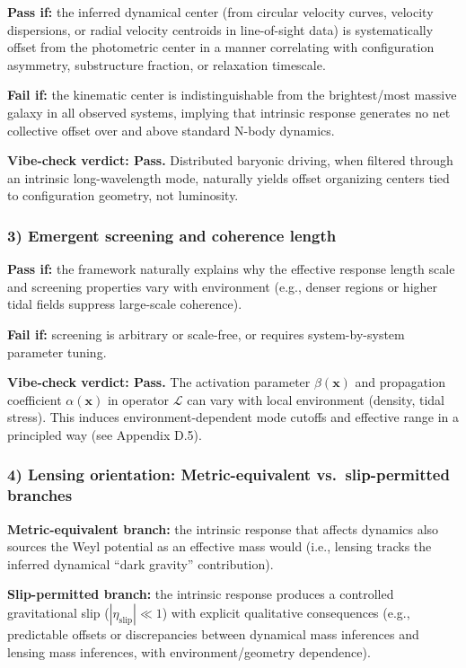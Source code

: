 \textbf{Pass if:} the inferred dynamical center (from circular velocity curves, velocity 
dispersions, or radial velocity centroids in line-of-sight data) is systematically offset 
from the photometric center in a manner correlating with configuration asymmetry, 
substructure fraction, or relaxation timescale.

\textbf{Fail if:} the kinematic center is indistinguishable from the brightest/most massive 
galaxy in all observed systems, implying that intrinsic response generates no net collective 
offset over and above standard N-body dynamics.

\checkmark \textbf{Vibe-check verdict: Pass.} Distributed baryonic driving, when filtered 
through an intrinsic long-wavelength mode, naturally yields offset organizing centers tied 
to configuration geometry, not luminosity.

\subsubsection{3) Emergent screening and coherence length}

\textbf{Pass if:} the framework naturally explains why the effective response length scale 
and screening properties vary with environment (e.g., denser regions or higher tidal fields 
suppress large-scale coherence).

\textbf{Fail if:} screening is arbitrary or scale-free, or requires system-by-system 
parameter tuning.

\checkmark \textbf{Vibe-check verdict: Pass.} The activation parameter $\beta(\mathbf{x})$ 
and propagation coefficient $\alpha(\mathbf{x})$ in operator $\mathcal{L}$ can vary with 
local environment (density, tidal stress). This induces environment-dependent mode cutoffs 
and effective range in a principled way (see Appendix D.5).

\subsubsection{4) Lensing orientation: Metric-equivalent vs.\ slip-permitted branches}

\textbf{Metric-equivalent branch:} the intrinsic response that affects dynamics also 
sources the Weyl potential as an effective mass would (i.e., lensing tracks the inferred 
dynamical ``dark gravity'' contribution).

\textbf{Slip-permitted branch:} the intrinsic response produces a controlled gravitational 
slip ($|\eta_{\text{slip}}| \ll 1$) with explicit qualitative consequences (e.g., predictable 
offsets or discrepancies between dynamical mass inferences and lensing mass inferences, with 
environment/geometry dependence).

